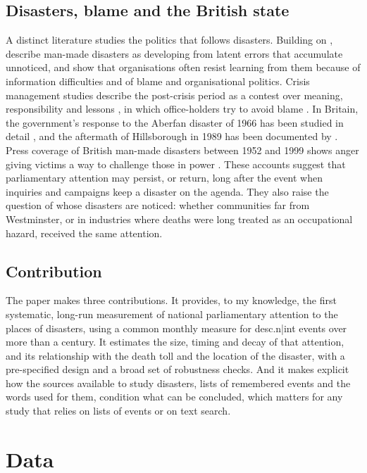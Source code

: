 \documentclass[11pt,a4paper]{article}
\begin{document}
\subsection{Disasters, blame and the British state}
A distinct literature studies the politics that follows disasters. Building on \citet{Turner1978}, \citet{PidgeonOLeary2000} describe man-made disasters as developing from latent errors that accumulate unnoticed, and show that organisations often resist learning from them because of information difficulties and of blame and organisational politics. Crisis management studies describe the post-crisis period as a contest over meaning, responsibility and lessons \citep{Boin2005,Boin2009}, in which office-holders try to avoid blame \citep{Hood2011}. In Britain, the government's response to the Aberfan disaster of 1966 has been studied in detail \citep{McLeanJohnes2000,Johnes2000}, and the aftermath of Hillsborough in 1989 has been documented by \citet{Scraton1999}. Press coverage of British man-made disasters between 1952 and 1999 shows anger giving victims a way to challenge those in power \citep{PanttiWahlJorgensen2011}. These accounts suggest that parliamentary attention may persist, or return, long after the event when inquiries and campaigns keep a disaster on the agenda. They also raise the question of whose disasters are noticed: whether communities far from Westminster, or in industries where deaths were long treated as an occupational hazard, received the same attention.

\subsection{Contribution}
The paper makes three contributions. It provides, to my knowledge, the first systematic, long-run measurement of national parliamentary attention to the places of disasters, using a common monthly measure for {{desc.n|int}} events over more than a century. It estimates the size, timing and decay of that attention, and its relationship with the death toll and the location of the disaster, with a pre-specified design and a broad set of robustness checks. And it makes explicit how the sources available to study disasters, lists of remembered events and the words used for them, condition what can be concluded, which matters for any study that relies on lists of events or on text search.

\section{Data}
\label{sec:data}
\end{document}
